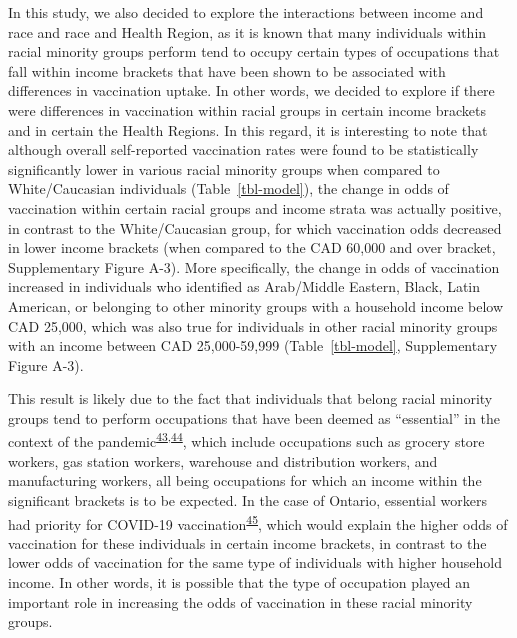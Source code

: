 \documentclass[
  letterpaper,
  DIV=11,
  numbers=noendperiod]{scrartcl}
\begin{document}
In this study, we also decided to explore the interactions between
income and race and race and Health Region, as it is known that many
individuals within racial minority groups perform tend to occupy certain
types of occupations that fall within income brackets that have been
shown to be associated with differences in vaccination uptake. In other
words, we decided to explore if there were differences in vaccination
within racial groups in certain income brackets and in certain the
Health Regions. In this regard, it is interesting to note that although
overall self-reported vaccination rates were found to be statistically
significantly lower in various racial minority groups when compared to
White/Caucasian individuals (Table~\ref{tbl-model}), the change in odds
of vaccination within certain racial groups and income strata was
actually positive, in contrast to the White/Caucasian group, for which
vaccination odds decreased in lower income brackets (when compared to
the CAD 60,000 and over bracket, Supplementary Figure A-3). More
specifically, the change in odds of vaccination increased in individuals
who identified as Arab/Middle Eastern, Black, Latin American, or
belonging to other minority groups with a household income below CAD
25,000, which was also true for individuals in other racial minority
groups with an income between CAD 25,000-59,999 (Table~\ref{tbl-model},
Supplementary Figure A-3).

This result is likely due to the fact that individuals that belong
racial minority groups tend to perform occupations that have been deemed
as ``essential'' in the context of the
pandemic\textsuperscript{\protect\hyperlink{ref-hawkins2020}{43},\protect\hyperlink{ref-ct2021}{44}},
which include occupations such as grocery store workers, gas station
workers, warehouse and distribution workers, and manufacturing workers,
all being occupations for which an income within the significant
brackets is to be expected. In the case of Ontario, essential workers
had priority for COVID-19
vaccination\textsuperscript{\protect\hyperlink{ref-mishra2021}{45}},
which would explain the higher odds of vaccination for these individuals
in certain income brackets, in contrast to the lower odds of vaccination
for the same type of individuals with higher household income. In other
words, it is possible that the type of occupation played an important
role in increasing the odds of vaccination in these racial minority
groups.
\end{document}
